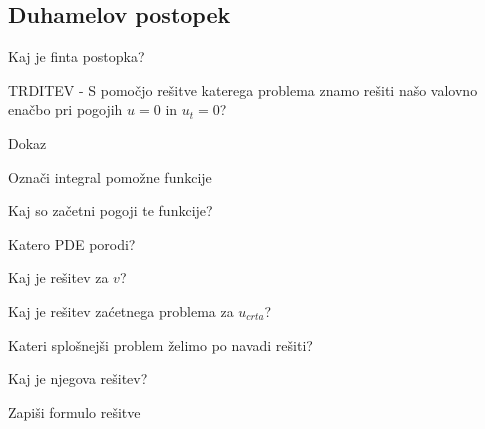 \documentclass{article}
\begin{document}
    \subsection{Duhamelov postopek}
    \begin{enumerate}
        \item Kaj je finta postopka?
        {\color{red}\item TRDITEV - S pomočjo rešitve katerega problema znamo rešiti našo valovno enačbo pri pogojih $u = 0$ in $u_t = 0$?}
        Dokaz
        \item Označi integral pomožne funkcije
        \item Kaj so začetni pogoji te funkcije?
        {\color{red}\item Katero PDE porodi?}
        {\color{red}\item Kaj je rešitev za $v$?}
        {\color{red}\item Kaj je rešitev zaćetnega problema za $u_{crta}$?}
        \item Kateri splošnejši problem želimo po navadi rešiti?
        \item Kaj je njegova rešitev?
        \item Zapiši formulo rešitve
    \end{enumerate}
\end{document}
